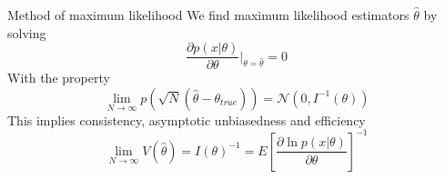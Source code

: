 \documentclass[
aspectratio=169,
14pt,
professionalfonts
]{beamer}
\begin{document}
\begin{frame}{Method of maximum likelihood}
    \vspace{-0.2cm}
    We find maximum likelihood estimators $ \hat \theta$ by solving
    $$
    \frac{\partial p(x|\theta)}{\partial \theta}\bigg\vert_{\theta = \hat \theta} = 0
    $$
    With the property
    $$
    \lim_{N \to \infty} p\left(\sqrt{N}(\hat \theta - \theta_{true})\right) = \mathcal{N}(0, I^{-1}(\theta))
    $$
    This implies consistency, asymptotic unbiasedness and efficiency
    $$ \lim_{N \to \infty} V(\hat \theta) = I(\theta)^{-1} = E\left[\frac{\partial \ln p(x|\theta)}{\partial \theta}\right]^{-1}$$
\end{frame}

\end{document}
